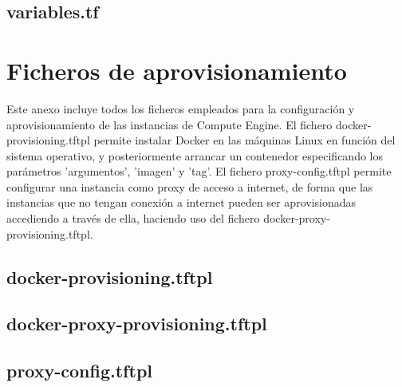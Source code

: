 \section*{variables.tf}


\chapter{Ficheros de aprovisionamiento} \label{anx:aprov}
  Este anexo incluye todos los ficheros empleados para la configuración y aprovisionamiento de las instancias de Compute Engine. El fichero docker-provisioning.tftpl permite instalar Docker en las máquinas Linux en función del sistema operativo, y posteriormente arrancar un contenedor especificando los parámetros 'argumentos', 'imagen' y 'tag'. El fichero proxy-config.tftpl permite configurar una instancia como proxy de acceso a internet, de forma que las instancias que no tengan conexión a internet pueden ser aprovisionadas accediendo a través de ella, haciendo uso del fichero docker-proxy-provisioning.tftpl.

\section*{docker-provisioning.tftpl} 

\clearpage

\section*{docker-proxy-provisioning.tftpl} 


\section*{proxy-config.tftpl} 

